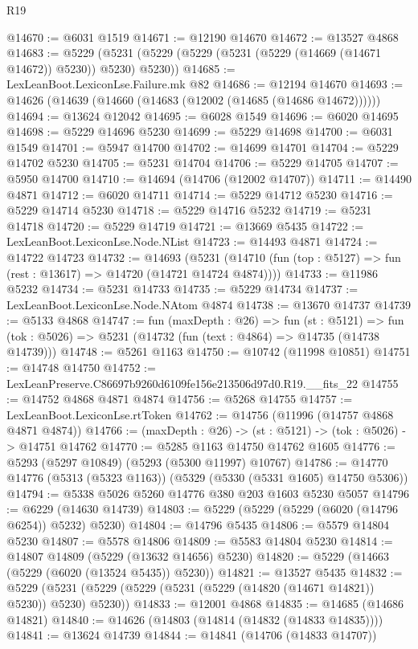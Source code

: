 \begin{lexlean}{R19}
\begin{coremodule}
@14670 := @6031 @1519
@14671 := @12190 @14670
@14672 := @13527 @4868
@14683 := @5229 (@5231 (@5229 (@5229 (@5231 (@5229 (@14669 (@14671 @14672)) @5230)) @5230) @5230))
@14685 := LexLeanBoot.LexiconLse.Failure.mk @82
@14686 := @12194 @14670
@14693 := @14626 (@14639 (@14660 (@14683 (@12002 (@14685 (@14686 @14672))))))
@14694 := @13624 @12042
@14695 := @6028 @1549
@14696 := @6020 @14695
@14698 := @5229 @14696 @5230
@14699 := @5229 @14698
@14700 := @6031 @1549
@14701 := @5947 @14700
@14702 := @14699 @14701
@14704 := @5229 @14702 @5230
@14705 := @5231 @14704
@14706 := @5229 @14705
@14707 := @5950 @14700
@14710 := @14694 (@14706 (@12002 @14707))
@14711 := @14490 @4871
@14712 := @6020 @14711
@14714 := @5229 @14712 @5230
@14716 := @5229 @14714 @5230
@14718 := @5229 @14716 @5232
@14719 := @5231 @14718
@14720 := @5229 @14719
@14721 := @13669 @5435
@14722 := LexLeanBoot.LexiconLse.Node.NList
@14723 := @14493 @4871
@14724 := @14722 @14723
@14732 := @14693
    (@5231 (@14710 (fun (top : @5127) => fun (rest : @13617) => @14720 (@14721 @14724 @4874))))
@14733 := @11986 @5232
@14734 := @5231 @14733
@14735 := @5229 @14734
@14737 := LexLeanBoot.LexiconLse.Node.NAtom @4874
@14738 := @13670 @14737
@14739 := @5133 @4868
@14747 := fun (maxDepth : @26) =>
  fun (st : @5121) =>
  fun (tok : @5026) => @5231 (@14732 (fun (text : @4864) => @14735 (@14738 @14739)))
@14748 := @5261 @1163
@14750 := @10742 (@11998 @10851)
@14751 := @14748 @14750
@14752 := LexLeanPreserve.C86697b9260d6109fe156e213506d97d0.R19.__fits_22
@14755 := @14752 @4868 @4871 @4874
@14756 := @5268 @14755
@14757 := LexLeanBoot.LexiconLse.rtToken
@14762 := @14756 (@11996 (@14757 @4868 @4871 @4874))
@14766 := (maxDepth : @26) -> (st : @5121) -> (tok : @5026) -> @14751 @14762
@14770 := @5285 @1163 @14750 @14762 @1605
@14776 := @5293 (@5297 @10849) (@5293 (@5300 @11997) @10767)
@14786 := @14770 @14776 (@5313 (@5323 @1163)) (@5329 (@5330 (@5331 @1605) @14750 @5306))
@14794 := @5338 @5026 @5260 @14776 @380 @203 @1603 @5230 @5057
@14796 := @6229 (@14630 @14739)
@14803 := @5229 (@5229 (@5229 (@6020 (@14796 @6254)) @5232) @5230)
@14804 := @14796 @5435
@14806 := @5579 @14804 @5230
@14807 := @5578 @14806
@14809 := @5583 @14804 @5230
@14814 := @14807 @14809 (@5229 (@13632 @14656) @5230)
@14820 := @5229 (@14663 (@5229 (@6020 (@13524 @5435)) @5230))
@14821 := @13527 @5435
@14832 := @5229 (@5231 (@5229 (@5229 (@5231 (@5229 (@14820 (@14671 @14821)) @5230)) @5230) @5230))
@14833 := @12001 @4868
@14835 := @14685 (@14686 @14821)
@14840 := @14626 (@14803 (@14814 (@14832 (@14833 @14835))))
@14841 := @13624 @14739
@14844 := @14841 (@14706 (@14833 @14707))

\end{coremodule}
\end{lexlean}

